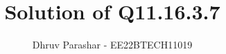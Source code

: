\documentclass[journal,12pt,twocolumn]{IEEEtran}
\theoremstyle{remark}
\begin{document}
%




\vspace{3cm}

\title{
Solution of Q11.16.3.7
}
\author{ Dhruv Parashar - EE22BTECH11019
}	


%
%
%

% 
%



% 
\end{document}
